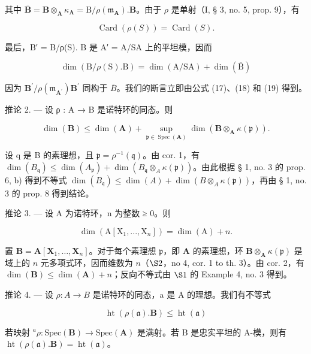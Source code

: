 其中 \(\overline{\mathbf{B}} = \mathbf{B} \otimes_{\mathbf{A}} \kappa_{\mathbf{A}} = \mathrm{B} / \rho(\mathfrak{m}_{\mathbf{A}}) . \mathbf{B}\)。由于 \(\rho\) 是单射（I, § 3, no. 5, prop. 9），有

\[
\operatorname{Card} (\rho (S)) = \operatorname{Card} (S).\tag{18}
\]

最后，B′ = B/ρ(S). B 是 A′ = A/SA 上的平坦模，因而

\[
\dim (\mathrm{B} / \rho (\mathrm{S}). \mathrm{B}) = \dim (\mathrm{A} / \mathrm{SA}) + \dim (\overline {{\mathrm{B}}})\tag{19}
\]

因为 \(\mathbf{B}^{\prime}/\rho(\mathfrak{m}_{\mathbf{A}^{\prime}})\mathbf{B}^{\prime}\) 同构于 \(\overline{B}\)。我们的断言立即由公式 (17)、(18) 和 (19) 得到。

推论 2. — 设 ρ : A → B 是诺特环的同态。则

\[
\dim (\mathbf {B}) \leqslant \dim (\mathbf {A}) + \sup _ {\mathfrak {p} \in \operatorname{Spec} (\mathbf {A})} \dim (\mathbf {B} \otimes_ {\mathbf {A}} \kappa (\mathfrak {p})).
\]

设 q 是 B 的素理想，且 \(\mathfrak{p} = \rho^{-1}(\mathfrak{q})\)。由 cor. 1，有 \(\dim(B_{\mathfrak{q}}) \leqslant \dim(A_{\mathfrak{p}}) + \dim(B_{\mathfrak{q}} \otimes_{A} \kappa(\mathfrak{p}))\)。由此根据 § 1, no. 3 的 prop. 6, b) 得到不等式 \(\dim(B_{\mathfrak{q}}) \leqslant \dim(A) + \dim(B \otimes_{A} \kappa(\mathfrak{p}))\)，再由 § 1, no. 3 的 prop. 8 得到结论。

推论 3. --- 设 A 为诺特环，n 为整数 ≥ 0。则

\[
\dim (\mathrm{A} [ \mathrm{X} _ {1},..., \mathrm{X} _ {n} ]) = \dim (\mathrm{A}) + n.
\]

置 \(\mathbf{B} = \mathbf{A}[\mathbf{X}_1, \ldots, \mathbf{X}_n]\)。对于每个素理想 \(\mathfrak{p}\)，即 \(\mathbf{A}\) 的素理想，环 \(\mathbf{B} \otimes_{\mathbf{A}} \kappa(\mathfrak{p})\) 是域上的 \(n\) 元多项式环，因而维数为 \(n\)（\(\S 2\)，no 4, cor. 1 to th. 3）。由 cor. 2，有 \(\dim(\mathbf{B}) \leqslant \dim(\mathbf{A}) + n\)；反向不等式由 \(\S 1\) 的 Example 4, no. 3 得到。

推论 4. --- 设 \(\rho: A \to B\) 是诺特环的同态，a 是 A 的理想。我们有不等式

\[
\operatorname{ht} (\rho (\mathfrak {a}). \mathbf {B}) \leqslant \operatorname{ht} (\mathfrak {a})\tag{20}
\]

若映射 \(^a\rho : \text{Spec}(\mathbf{B}) \to \text{Spec}(\mathbf{A})\) 是满射。若 B 是忠实平坦的 A-模，则有 \(\operatorname{ht}(\rho(\mathfrak{a}).\mathbf{B}) = \operatorname{ht}(\mathfrak{a})\)。


